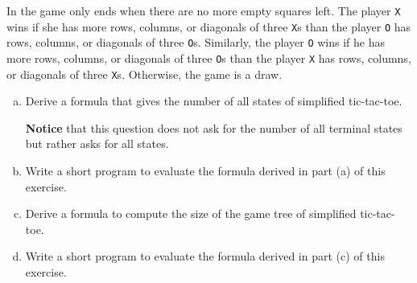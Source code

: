 \exercise
In  the game only ends when there are no more empty squares left.
The player \texttt{X} wins if she has more rows, columns, or diagonals of three \texttt{X}s than the player
\texttt{O} has rows, columns, or diagonals of three \texttt{O}s.  Similarly, the player \texttt{O} wins
if he has more rows, columns, or diagonals of three \texttt{O}s than the player \texttt{X} has rows, columns,
or diagonals of three \texttt{X}s.  Otherwise, the game is a draw. 
\begin{enumerate}[(a)]
\item Derive a formula that gives the number of all states of simplified tic-tac-toe.  

      \textbf{Notice} that this question does not ask for the number of all terminal states but rather asks for
      all states. 
\item Write a short program to evaluate the formula derived in part (a) of this exercise.
\item Derive a formula to compute the size of the game tree of simplified tic-tac-toe.
\item Write a short program to evaluate the formula derived in part (c) of this exercise.
\end{enumerate}

